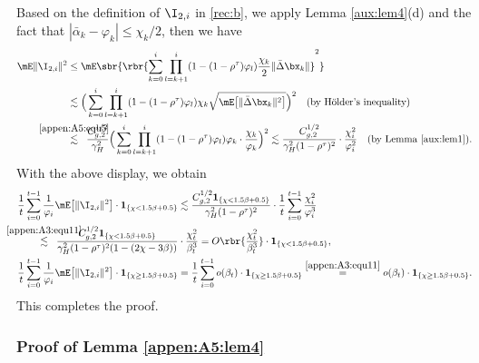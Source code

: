 Based on the definition of $\I_{2,i}$ in \eqref{rec:b}, we apply Lemma \ref{aux:lem4}(d) and the fact that $|\bar{\alpha}_k-\varphi_k|\leq \chi_k/2$, then we have
\begin{equation*}
\begin{aligned}
\mE\|\I_{2,i}\|^2 &\leq \mE\sbr{\rbr{\sum_{k=0}^i \prod_{l=k+1}^i(1-(1-\rho^\tau)\varphi_l) \frac{\chi_k}{2}\|\bar{\Delta} \bx_k\|}^2}\\
& \lesssim \Big(\sum_{k=0}^i \prod_{l=k+1}^i(1-(1-\rho^\tau)\varphi_l) \chi_k\sqrt{\mE\big[\|\bar{\Delta} \bx_k\|^2\big]}\Big)^2\quad(\text{by H\"older's inequality})\\
&\stackrel{\mathclap{\eqref{appen:A5:equ5}}}{\lesssim}\;\; \frac{C_{g,2}^{1/2}}{\gamma_H^2}\Big(\sum_{k=0}^i \prod_{l=k+1}^i(1-(1-\rho^\tau)\varphi_l)\varphi_k\cdot\frac{\chi_k}{\varphi_k}\Big)^2 \lesssim \frac{C_{g,2}^{1/2}}{\gamma_H^2(1-\rho^\tau)^2}\cdot \frac{\chi_i^2}{\varphi_i^2}\quad(\text{by Lemma \ref{aux:lem1}}).    
\end{aligned}
\end{equation*}
With the above display, we obtain
\begin{align}\label{appen:A5:equ14}
&\frac{1}{t}\sum_{i=0}^{t-1}\frac{1}{\varphi_i}\mE\big[\|\I_{2,i}\|^2\big]\cdot \mathbf{1}_{\{\chi< 1.5\beta+0.5\}} \lesssim \frac{C_{g,2}^{1/2}\mathbf{1}_{\{\chi< 1.5\beta+0.5\}}}{\gamma_H^2(1-\rho^\tau)^2}\cdot \frac{1}{t}\sum_{i=0}^{t-1}\frac{\chi_i^2}{\varphi_i^3}\nonumber\\
&\quad\quad \stackrel{\mathclap{\eqref{appen:A3:equ11}}}{\lesssim}\;\; \frac{C_{g,2}^{1/2}\mathbf{1}_{\{\chi< 1.5\beta+0.5\}}}{\gamma_H^2(1-\rho^\tau)^2(1-(2\chi-3\beta))}\cdot\frac{\chi_t^2}{\beta_t^3} = O\rbr{\frac{\chi_t^2}{\beta_t^3}}\cdot \mathbf{1}_{\{\chi< 1.5\beta+0.5\}},\\
&\frac{1}{t}\sum_{i=0}^{t-1}\frac{1}{\varphi_i}\mE\big[\|\I_{2,i}\|^2\big]\cdot \mathbf{1}_{\{\chi\geq 1.5\beta+0.5\}} = \frac{1}{t}\sum_{i=0}^{t-1} o(\beta_t)\cdot \mathbf{1}_{\{\chi\geq 1.5\beta+0.5\}} \stackrel{\eqref{appen:A3:equ11}}{=} o(\beta_t)\cdot \mathbf{1}_{\{\chi\geq 1.5\beta+0.5\}}.    \nonumber
\end{align}
This completes the proof.


\subsubsection{Proof of Lemma \ref{appen:A5:lem4}}\label{pf:I3}

